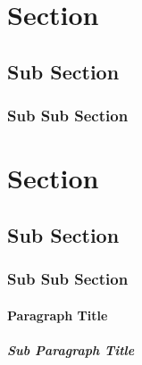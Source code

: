 
    \section{Section}\label{sec:section}
    \lipsum[1-1]
    \subsection{Sub Section}\label{subsec:sub-section}
    \lipsum[2-3]
    \subsubsection{Sub Sub Section}\label{subsubsec:sub-sub-section}
    \lipsum[4-4]

    \section*{Section}\label{sec:sectionnoenumerate}
    \lipsum[1-1]
    \subsection*{Sub Section}\label{subsec:sub-sectionnoenumerate}
    \lipsum[2-3]
    \subsubsection*{Sub Sub Section}
    \lipsum[4-4]

    \paragraph{Paragraph Title}\label{par:paragraph-title}
    \lipsum[4-4]
    \subparagraph{Sub Paragraph Title}\label{subpar:sub-paragraph-title}
    \lipsum[4-4]